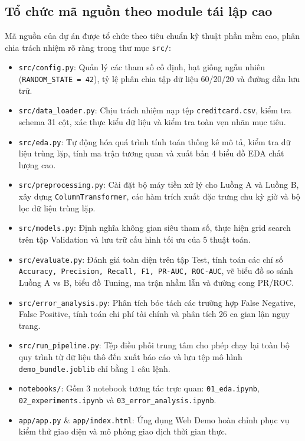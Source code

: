 \documentclass[13pt,a4paper]{extarticle}
\begin{document}
\subsection{Tổ chức mã nguồn theo module tái lập cao}
Mã nguồn của dự án được tổ chức theo tiêu chuẩn kỹ thuật phần mềm cao, phân chia trách nhiệm rõ ràng trong thư mục \texttt{src/}:
\begin{itemize}
    \item \texttt{src/config.py}: Quản lý các tham số cố định, hạt giống ngẫu nhiên (\texttt{RANDOM\_STATE = 42}), tỷ lệ phân chia tập dữ liệu 60/20/20 và đường dẫn lưu trữ.
    \item \texttt{src/data\_loader.py}: Chịu trách nhiệm nạp tệp \texttt{creditcard.csv}, kiểm tra schema 31 cột, xác thực kiểu dữ liệu và kiểm tra toàn vẹn nhãn mục tiêu.
    \item \texttt{src/eda.py}: Tự động hóa quá trình tính toán thống kê mô tả, kiểm tra dữ liệu trùng lặp, tính ma trận tương quan và xuất bản 4 biểu đồ EDA chất lượng cao.
    \item \texttt{src/preprocessing.py}: Cài đặt bộ máy tiền xử lý cho Luồng A và Luồng B, xây dựng \texttt{ColumnTransformer}, các hàm trích xuất đặc trưng chu kỳ giờ và bộ lọc dữ liệu trùng lặp.
    \item \texttt{src/models.py}: Định nghĩa không gian siêu tham số, thực hiện grid search trên tập Validation và lưu trữ cấu hình tối ưu của 5 thuật toán.
    \item \texttt{src/evaluate.py}: Đánh giá toàn diện trên tập Test, tính toán các chỉ số \texttt{Accuracy, Precision, Recall, F1, PR-AUC, ROC-AUC}, vẽ biểu đồ so sánh Luồng A vs B, biểu đồ Tuning, ma trận nhầm lẫn và đường cong PR/ROC.
    \item \texttt{src/error_analysis.py}: Phân tích bóc tách các trường hợp False Negative, False Positive, tính toán chi phí tài chính và phân tích 26 ca gian lận ngụy trang.
    \item \texttt{src/run_pipeline.py}: Tệp điều phối trung tâm cho phép chạy lại toàn bộ quy trình từ dữ liệu thô đến xuất báo cáo và lưu tệp mô hình \texttt{demo_bundle.joblib} chỉ bằng 1 câu lệnh.
    \item \texttt{notebooks/}: Gồm 3 notebook tương tác trực quan: \texttt{01_eda.ipynb}, \texttt{02_experiments.ipynb} và \texttt{03_error_analysis.ipynb}.
    \item \texttt{app/app.py} \& \texttt{app/index.html}: Ứng dụng Web Demo hoàn chỉnh phục vụ kiểm thử giao diện và mô phỏng giao dịch thời gian thực.
\end{itemize}
\end{document}
